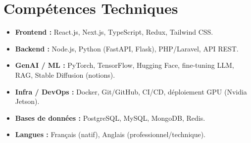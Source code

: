 \documentclass[a4paper,11pt]{article}
\begin{document}
\section{Compétences Techniques}
\begin{itemize}[leftmargin=*, nosep]
    \item \small{\textbf{Frontend :} React.js, Next.js, TypeScript, Redux, Tailwind CSS.}
    \item \small{\textbf{Backend :} Node.js, Python (FastAPI, Flask), PHP/Laravel, API REST.}
    \item \small{\textbf{GenAI / ML :} PyTorch, TensorFlow, Hugging Face, fine-tuning LLM, RAG, Stable Diffusion (notions).}
    \item \small{\textbf{Infra / DevOps :} Docker, Git/GitHub, CI/CD, déploiement GPU (Nvidia Jetson).}
    \item \small{\textbf{Bases de données :} PostgreSQL, MySQL, MongoDB, Redis.}
    \item \small{\textbf{Langues :} Français (natif), Anglais (professionnel/technique).}
\end{itemize}

\end{document}
